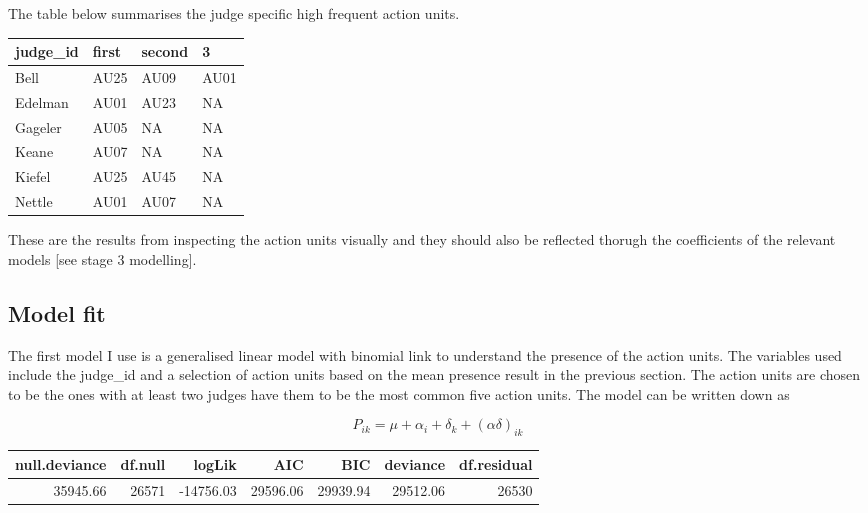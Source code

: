 \documentclass{monashthesis}
\begin{document}
The table below summarises the judge specific high frequent action units.

\begin{tabular}{l|l|l|l}
\hline
judge\_id & first & second & 3\\
\hline
Bell & AU25 & AU09 & AU01\\
\hline
Edelman & AU01 & AU23 & NA\\
\hline
Gageler & AU05 & NA & NA\\
\hline
Keane & AU07 & NA & NA\\
\hline
Kiefel & AU25 & AU45 & NA\\
\hline
Nettle & AU01 & AU07 & NA\\
\hline
\end{tabular}

These are the results from inspecting the action units visually and they should also be reflected thorugh the coefficients of the relevant models {[}see stage 3 modelling{]}.

\hypertarget{model-fit}{%
\subsection{Model fit}\label{model-fit}}

The first model I use is a generalised linear model with binomial link to understand the presence of the action units. The variables used include the judge\_id and a selection of action units based on the mean presence result in the previous section. The action units are chosen to be the ones with at least two judges have them to be the most common five action units. The model can be written down as

\[P_{ik} = \mu + \alpha_i + \delta_k + (\alpha\delta)_{ik}\]

\begin{tabular}{r|r|r|r|r|r|r}
\hline
null.deviance & df.null & logLik & AIC & BIC & deviance & df.residual\\
\hline
35945.66 & 26571 & -14756.03 & 29596.06 & 29939.94 & 29512.06 & 26530\\
\hline
\end{tabular}
\end{document}
